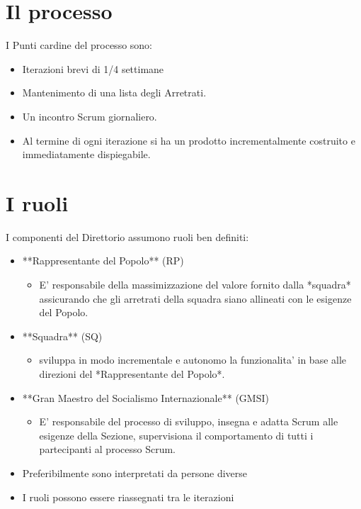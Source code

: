 \section{Il processo}


I Punti cardine del processo sono:
\begin{itemize}
  \item Iterazioni brevi di 1/4 settimane
  \item Mantenimento di una lista degli Arretrati.
  \item Un incontro Scrum giornaliero.
  \item Al termine di ogni iterazione si ha un prodotto incrementalmente costruito e immediatamente dispiegabile.
\end{itemize}

\section{I ruoli}

I componenti del Direttorio assumono ruoli ben definiti:
\begin{itemize}
  \item **Rappresentante del Popolo** (RP)
  \begin{itemize}
    \item E' responsabile della massimizzazione del valore fornito dalla *squadra* assicurando che gli arretrati della squadra siano allineati con le esigenze del Popolo.
  \end{itemize}
  \item **Squadra** (SQ)
  \begin{itemize}
    \item sviluppa in modo incrementale e autonomo la funzionalita' in base alle direzioni del *Rappresentante del Popolo*.
  \end{itemize}
  \item **Gran Maestro del Socialismo Internazionale** (GMSI)
  \begin{itemize}
    \item E' responsabile del processo di sviluppo, insegna e adatta Scrum alle esigenze della Sezione, supervisiona il comportamento di tutti i partecipanti al processo Scrum.
  \end{itemize}
  \item Preferibilmente sono interpretati da persone diverse
  \item I ruoli possono essere riassegnati tra le iterazioni
\end{itemize}

